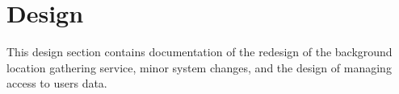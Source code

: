 \section{Design}
This design section contains documentation of the redesign of the background location gathering service, minor system changes, and the design of managing access to users data.





